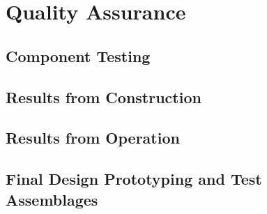 \section{Quality Assurance}
\label{sec:fdsp-apa-qa}


\subsection{Component Testing}
\label{sec:fdsp-apa-qa-testing}

\subsection{Results from  Construction}
\label{sec:fdsp-apa-qa-protodune-const}

\subsection{Results from  Operation}
\label{sec:fdsp-apa-qa-protodune-ops}


\subsection{Final Design Prototyping and Test Assemblages}
\label{sec:fdsp-apa-qa-prototyping}